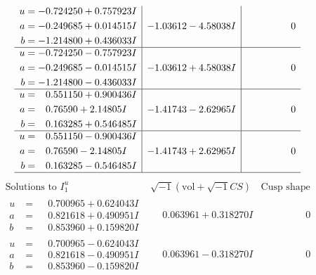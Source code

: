 \documentclass[1p]{elsarticle_modified}
\theoremstyle{definition}
\newcommand{\I}{\sqrt{-1}}
\begin{document}
$$\begin{array}{c|c|c}
\begin{aligned}
u &= -0.724250 + 0.757923 I \\
a &= -0.249685 + 0.014515 I \\
b &= -1.214800 + 0.436033 I\end{aligned}
 & -1.03612 - 4.58038 I & \phantom{-0.000000 } 0 \\ \hline\begin{aligned}
u &= -0.724250 - 0.757923 I \\
a &= -0.249685 - 0.014515 I \\
b &= -1.214800 - 0.436033 I\end{aligned}
 & -1.03612 + 4.58038 I & \phantom{-0.000000 } 0 \\ \hline\begin{aligned}
u &= \phantom{-}0.551150 + 0.900436 I \\
a &= \phantom{-}0.76590 + 2.14805 I \\
b &= \phantom{-}0.163285 + 0.546485 I\end{aligned}
 & -1.41743 - 2.62965 I & \phantom{-0.000000 } 0 \\ \hline\begin{aligned}
u &= \phantom{-}0.551150 - 0.900436 I \\
a &= \phantom{-}0.76590 - 2.14805 I \\
b &= \phantom{-}0.163285 - 0.546485 I\end{aligned}
 & -1.41743 + 2.62965 I & \phantom{-0.000000 } 0\\
 \hline 
 \end{array}$$\newpage$$\begin{array}{c|c|c}  
\text{Solutions to }I^u_{1}& \I (\text{vol} + \sqrt{-1}CS) & \text{Cusp shape}\\
 \hline 
\begin{aligned}
u &= \phantom{-}0.700965 + 0.624043 I \\
a &= \phantom{-}0.821618 + 0.490951 I \\
b &= \phantom{-}0.853960 + 0.159820 I\end{aligned}
 & \phantom{-}0.063961 + 0.318270 I & \phantom{-0.000000 } 0 \\ \hline\begin{aligned}
u &= \phantom{-}0.700965 - 0.624043 I \\
a &= \phantom{-}0.821618 - 0.490951 I \\
b &= \phantom{-}0.853960 - 0.159820 I\end{aligned}
 & \phantom{-}0.063961 - 0.318270 I & \phantom{-0.000000 } 0 \\ \hline\begin{aligned}

\end{aligned}
\end{array}$$
\end{document}
